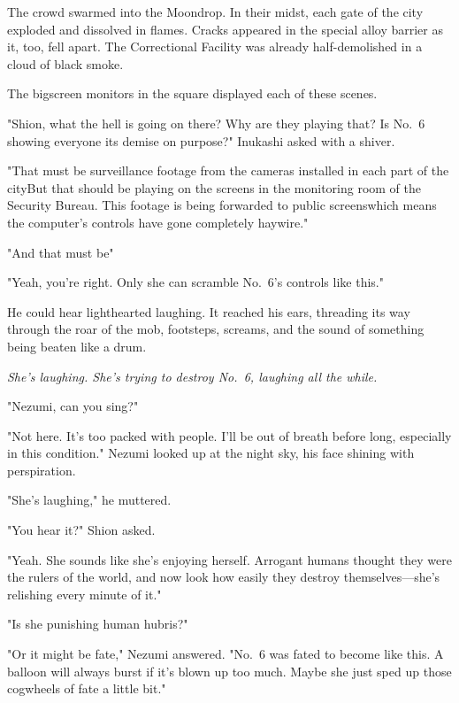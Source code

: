 The crowd swarmed into the Moondrop. In their midst, each gate of the
city exploded and dissolved in flames. Cracks appeared in the special
alloy barrier as it, too, fell apart. The Correctional Facility was
already half-demolished in a cloud of black smoke.

The bigscreen monitors in the square displayed each of these scenes.

"Shion, what the hell is going on there? Why are they playing that? Is
No.~6 showing everyone its demise on purpose?" Inukashi asked with a
shiver.

"That must be surveillance footage from the cameras installed in each
part of the city\el But that should be playing on the screens in the
monitoring room of the Security Bureau. This footage is being forwarded
to public screens\el which means the computer's controls have gone
completely haywire."

"And that must be\el "

"Yeah, you're right. Only she can scramble No.~6's controls like this."



He could hear lighthearted laughing. It reached his ears, threading its
way through the roar of the mob, footsteps, screams, and the sound of
something being beaten like a drum.



\emph{She's laughing. She's trying to destroy No.~6, laughing all the while.}

"Nezumi, can you sing?"

"\el Not here. It's too packed with people. I'll be out of breath before
long, especially in this condition." Nezumi looked up at the night sky,
his face shining with perspiration.

"She's laughing," he muttered.

"You hear it?" Shion asked.

"Yeah. She sounds like she's enjoying herself. Arrogant humans thought
they were the rulers of the world, and now look how easily they destroy
themselves---she's relishing every minute of it."

"Is she punishing human hubris?"

"Or it might be fate," Nezumi answered. "No.~6 was fated to become like
this. A balloon will always burst if it's blown up too much. Maybe she
just sped up those cogwheels of fate a little bit."

